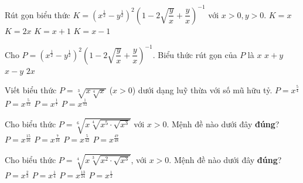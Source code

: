\begin{ex}%
	Rút gọn biểu thức $K=\left(x^{\tfrac{1}{2}}-y^{\tfrac{1}{2}}\right)^2\left(1-2\sqrt{\dfrac{y}{x}}+\dfrac{y}{x}\right)^{-1}$ với $x>0,y>0$. 
	\choice
	{\True $K=x$}
	{$K=2x$}
	{$K=x+1$}
	{$K=x-1$}
\end{ex}
\begin{ex}%
	Cho $P=\left(x^{\tfrac{1}{2}}-y^{\tfrac{1}{2}}\right)^2\left(1-2\sqrt{\dfrac{y}{x}}+\dfrac{y}{x}\right)^{-1}$. Biểu thức rút gọn của $P$ là 
	\choice
	{\True $x$}
	{$x+y$}
	{$x-y$}
	{$2x$}
\end{ex}
\begin{ex}%
	Viết biểu thức $P=\sqrt[3]{x\sqrt[4]{x}}$ ($x>0$) dưới dạng luỹ thừa với số mũ hữu tỷ. 
	\choice
	{$P=x^{\tfrac{5}{4}}$}
	{\True $P=x^{\tfrac{5}{12}}$}
	{$P=x^{\tfrac{1}{7}}$}
	{$P=x^{\tfrac{1}{12}}$}
\end{ex}
\begin{ex}%
	Cho biểu thức $P=\sqrt[6]{x\sqrt[4]{x^5\cdot\sqrt{x^3}}}$ với $x>0$. Mệnh đề nào dưới đây \textbf{đúng}?
	\choice
	{$P=x^{\tfrac{15}{16}}$}
	{\True $P=x^{\tfrac{7}{16}}$}
	{$P=x^{\tfrac{5}{42}}$}
	{$P=x^{\tfrac{47}{48}}$}
\end{ex}
\begin{ex}%
	Cho biểu thức $P=\sqrt[4]{x\sqrt[3]{x^2\cdot\sqrt{x^3}}}$, với $x>0$. Mệnh đề nào dưới đây \textbf{đúng}?
	\choice
	{$P=x^{\tfrac{2}{3}}$}
	{$P=x^{\tfrac{1}{4}}$}
	{\True $P=x^{\tfrac{13}{24}}$}
	{$P=x^{\tfrac{1}{2}}$}
\end{ex}
